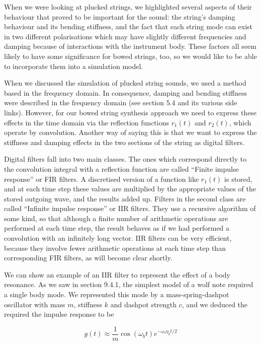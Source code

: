   When we were looking at plucked strings, we highlighted several aspects of 
  their behaviour that proved to be important for the sound: the string’s 
  damping behaviour and its bending stiffness, and the fact that each string 
  mode can exist in two different polarisations which may have slightly 
  different frequencies and damping because of interactions with the instrument 
  body. These factors all seem likely to have some significance for bowed 
  strings, too, so we would like to be able to incorporate them into a 
  simulation model. 

  When we discussed the simulation of plucked string sounds, we used a method 
  based in the frequency domain. In consequence, damping and bending stiffness 
  were described in the frequency domain (see section 5.4 and its various side 
  links). However, for our bowed string synthesis approach we need to express 
  these effects in the time domain via the reflection functions $r_1(t)$ and 
  $r_2(t)$, which operate by convolution. Another way of saying this is that we 
  want to express the stiffness and damping effects in the two sections of the 
  string as digital filters. 

  Digital filters fall into two main classes. The ones which correspond 
  directly to the convolution integral with a reflection function are called 
  ``Finite impulse response'' or FIR filters. A discretised version of a 
  function like $r_1(t)$ is stored, and at each time step these values are 
  multiplied by the appropriate values of the stored outgoing wave, and the 
  results added up. Filters in the second class are called ``Infinite impulse 
  response'' or IIR filters. They use a recursive algorithm of some kind, so 
  that although a finite number of arithmetic operations are performed at each 
  time step, the result behaves as if we had performed a convolution with an 
  infinitely long vector. IIR filters can be very efficient, because they 
  involve fewer arithmetic operations at each time step than corresponding FIR 
  filters, as will become clear shortly. 

  We can show an example of an IIR filter to represent the effect of a body 
  resonance. As we saw in section 9.4.1, the simplest model of a wolf note 
  required a single body mode. We represented this mode by a 
  mass-spring-dashpot oscillator with mass $m$, stiffness $k$ and dashpot 
  strength $c$, and we deduced the required the impulse response to be 

  \begin{equation*}g(t) \approx \dfrac{1}{m} \cos (\omega_b t) e^{-\omega_b 
  \eta_b t/2} \tag{1}\end{equation*} 

